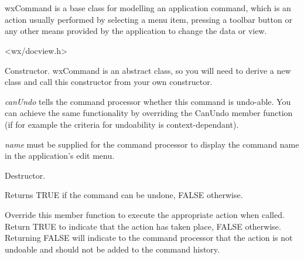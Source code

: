 \section{}\label{wxcommand}

wxCommand is a base class for modelling an application command,
which is an action usually performed by selecting a menu item, pressing
a toolbar button or any other means provided by the application to
change the data or view.




<wx/docview.h>






Constructor. wxCommand is an abstract class, so you will need to derive
a new class and call this constructor from your own constructor.

{\it canUndo} tells the command processor whether this command is undo-able. You
can achieve the same functionality by overriding the CanUndo member function (if for example
the criteria for undoability is context-dependant).

{\it name} must be supplied for the command processor to display the command name
in the application's edit menu.



Destructor.



Returns TRUE if the command can be undone, FALSE otherwise.



Override this member function to execute the appropriate action when called.
Return TRUE to indicate that the action has taken place, FALSE otherwise.
Returning FALSE will indicate to the command processor that the action is
not undoable and should not be added to the command history.

